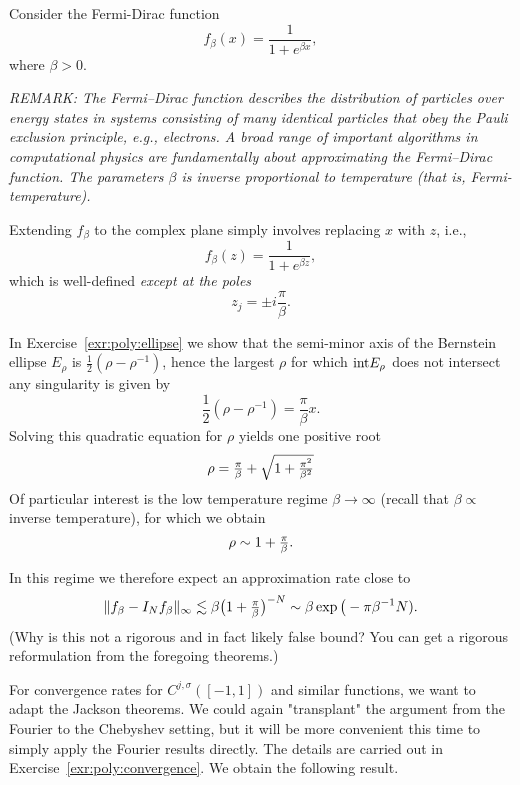 \begin{example}
   \label{exa:poly:fermi-dirac}
   Consider the Fermi-Dirac function
   \begin{equation}
     f_\beta(x) = \frac{1}{1 + e^{\beta x}},
   \end{equation}
   where $\beta > 0$.
 
   {\it REMARK: The Fermi--Dirac function describes the distribution of particles
   over energy states in systems consisting of many identical particles that obey
   the Pauli exclusion principle, e.g., electrons. A broad range of important
   algorithms in computational physics are fundamentally about approximating the
   Fermi--Dirac function. The parameters $\beta$ is inverse proportional to
   temperature (that is, Fermi-temperature).}
 
   Extending $f_\beta$ to the complex plane simply involves replacing $x$ with
   $z$, i.e.,
   \[
     f_\beta(z) = \frac{1}{1 + e^{\beta z}},
   \]
   which is well-defined {\em except at the poles}
   \[
       z_j = \pm i  \frac{\pi}{\beta}.
   \]

   In Exercise~\ref{exr:poly:ellipse} we show that the semi-minor axis of the 
   Bernstein ellipse $E_\rho$ is $\frac12 (\rho-\rho^{-1})$, hence the largest 
   $\rho$ for which ${\rm int}E_\rho$ does not intersect any singularity is 
   given by 
   \[ \frac12 (\rho-\rho^{-1}) = \frac{\pi}{\beta}x. \]
   Solving this quadratic equation for $\rho$ yields one positive root 
   \[ \rho = {\textstyle \frac{\pi}{\beta}}+\sqrt{1 + {\textstyle \frac{\pi^2}{\beta^2}}}
   \]
   Of particular interest is the low temperature regime $\beta \to \infty$ 
   (recall that $\beta \propto$ inverse temperature), for which we obtain 
   \[
      \rho \sim 1 + {\textstyle \frac{\pi}{\beta}}.
   \]
   
   In this regime we therefore expect an approximation rate close to 
   \[
      \| f_\beta - I_N f_\beta \|_{\infty} 
      \lesssim \beta \big(1 + {\textstyle \frac{\pi}{\beta}}\big)^{-N}
      \sim \beta \exp\big( - \pi \beta^{-1} N).
   \] 
   (Why is this not a rigorous and in fact likely false bound? You can get 
   a rigorous reformulation from the foregoing theorems.)
 \end{example}


For convergence rates for $C^{j,\sigma}([-1,1])$ and similar functions, we
want to adapt the Jackson theorems. We could again "transplant" the argument
from the Fourier to the Chebyshev setting, but it will be more convenient
this time to simply apply the Fourier results directly. The details
are carried out in Exercise~\ref{exr:poly:convergence}. We obtain
the following result.

